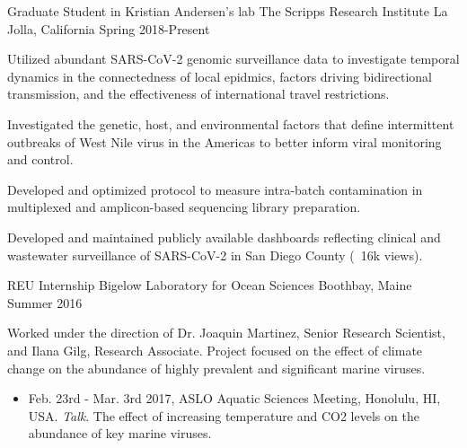
\begin{cventries}

  \cventry
    {Graduate Student in Kristian Andersen's lab} %
    {The Scripps Research Institute} %
    {La Jolla, California} %
    {Spring 2018-Present} %
    {
      \begin{cvitems} %
        \item {Utilized abundant SARS-CoV-2 genomic surveillance data to investigate temporal dynamics in the connectedness of local epidmics, factors driving bidirectional transmission, and the effectiveness of international travel restrictions.}
        \item {Investigated the genetic, host, and environmental factors that define intermittent outbreaks of West Nile virus in the Americas to better inform viral monitoring and control.}
        \item {Developed and optimized protocol to measure intra-batch contamination in multiplexed and amplicon-based sequencing library preparation.}
        \item {Developed and maintained publicly available dashboards reflecting clinical and wastewater surveillance of SARS-CoV-2 in San Diego County (~16k views).}
      \end{cvitems}
    }

  \cventry
    {REU Internship} %
    {Bigelow Laboratory for Ocean Sciences} %
    {Boothbay, Maine} %
    {Summer 2016} %
    {
      \begin{cvitems}
        \item{
          Worked under the direction of Dr. Joaquin Martinez, Senior Research Scientist, and Ilana Gilg, Research Associate.
          Project focused on the effect of climate change on the abundance of highly prevalent and significant marine viruses.
          \begin{itemize}
            \item{Feb. 23rd - Mar. 3rd 2017, ASLO Aquatic Sciences Meeting, Honolulu, HI, USA. \textit{Talk}. The effect of increasing temperature and CO2 levels on the abundance of key marine viruses.}
          \end{itemize}
        }
      \end{cvitems}
    }


\end{cventries}
